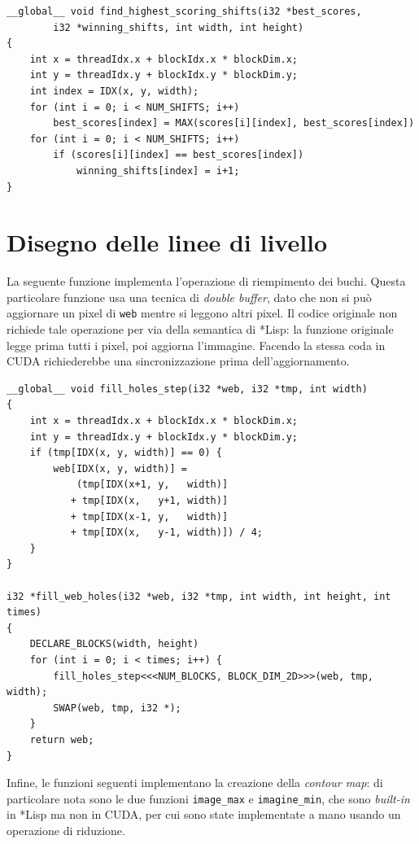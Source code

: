 \documentclass[12pt,a4paper,openright,twoside]{report}
\begin{document}
\begin{lstlisting}[style=mystyle]
__global__ void find_highest_scoring_shifts(i32 *best_scores,
        i32 *winning_shifts, int width, int height)
{
    int x = threadIdx.x + blockIdx.x * blockDim.x;
    int y = threadIdx.y + blockIdx.y * blockDim.y;
    int index = IDX(x, y, width);
    for (int i = 0; i < NUM_SHIFTS; i++)
        best_scores[index] = MAX(scores[i][index], best_scores[index])
    for (int i = 0; i < NUM_SHIFTS; i++)
        if (scores[i][index] == best_scores[index])
            winning_shifts[index] = i+1;
}
\end{lstlisting}

\section{Disegno delle linee di livello}

La seguente funzione implementa l'operazione di riempimento dei buchi. Questa particolare funzione usa una tecnica di \textit{double buffer}, dato che non si può aggiornare un pixel di \verb|web| mentre si leggono altri pixel. Il codice originale non richiede tale operazione per via della semantica di *Lisp: la funzione originale legge prima tutti i pixel, poi aggiorna l'immagine. Facendo la stessa coda in CUDA richiederebbe una sincronizzazione prima dell'aggiornamento.

\begin{lstlisting}[style=mystyle]
__global__ void fill_holes_step(i32 *web, i32 *tmp, int width)
{
    int x = threadIdx.x + blockIdx.x * blockDim.x;
    int y = threadIdx.y + blockIdx.y * blockDim.y;
    if (tmp[IDX(x, y, width)] == 0) {
        web[IDX(x, y, width)] =
            (tmp[IDX(x+1, y,   width)]
           + tmp[IDX(x,   y+1, width)]
           + tmp[IDX(x-1, y,   width)]
           + tmp[IDX(x,   y-1, width)]) / 4;
    }
}

i32 *fill_web_holes(i32 *web, i32 *tmp, int width, int height, int times)
{
    DECLARE_BLOCKS(width, height)
    for (int i = 0; i < times; i++) {
        fill_holes_step<<<NUM_BLOCKS, BLOCK_DIM_2D>>>(web, tmp, width);
        SWAP(web, tmp, i32 *);
    }
    return web;
}
\end{lstlisting}

Infine, le funzioni seguenti implementano la creazione della \textit{contour map}: di particolare nota sono le due funzioni \verb|image_max| e \verb|imagine_min|, che sono \textit{built-in} in *Lisp ma non in CUDA, per cui sono state implementate a mano usando un operazione di riduzione.
\end{document}
